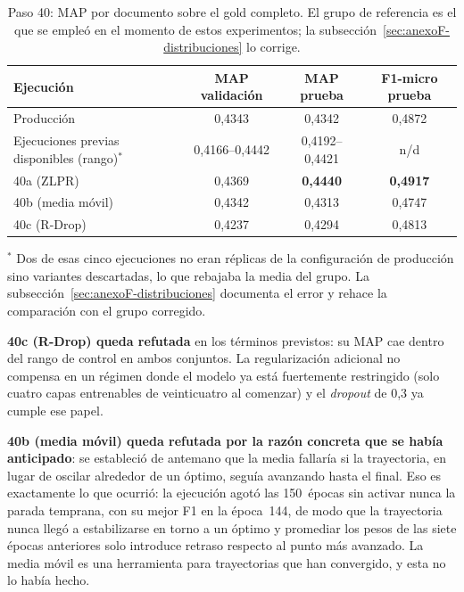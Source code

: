 \begin{table}[h]
\centering
\caption{Paso 40: MAP por documento sobre el gold completo. El grupo de referencia es el que se empleó en el momento de estos experimentos; la subsección~\ref{sec:anexoF-distribuciones} lo corrige.}
\label{tab:map-paso40}
\begin{tabular}{lccc}
\hline
\textbf{Ejecución} & \textbf{MAP validación} & \textbf{MAP prueba} & \textbf{F1-micro prueba} \\
\hline
Producción & 0{,}4343 & 0{,}4342 & 0{,}4872 \\
Ejecuciones previas disponibles (rango)$^{*}$ & 0{,}4166--0{,}4442 & 0{,}4192--0{,}4421 & n/d \\
\hline
40a (ZLPR) & 0{,}4369 & \textbf{0{,}4440} & \textbf{0{,}4917} \\
40b (media móvil) & 0{,}4342 & 0{,}4313 & 0{,}4747 \\
40c (R-Drop) & 0{,}4237 & 0{,}4294 & 0{,}4813 \\
\hline
\end{tabular}

\vspace{2mm}
{\footnotesize $^{*}$ Dos de esas cinco ejecuciones no eran réplicas de la configuración de producción sino variantes descartadas, lo que rebajaba la media del grupo. La subsección~\ref{sec:anexoF-distribuciones} documenta el error y rehace la comparación con el grupo corregido.}
\end{table}

\textbf{40c (R-Drop) queda refutada} en los términos previstos: su MAP cae dentro del rango de control en ambos conjuntos. La regularización adicional no compensa en un régimen donde el modelo ya está fuertemente restringido (solo cuatro capas entrenables de veinticuatro al comenzar) y el \emph{dropout} de 0{,}3 ya cumple ese papel.

\textbf{40b (media móvil) queda refutada por la razón concreta que se había anticipado}: se estableció de antemano que la media fallaría si la trayectoria, en lugar de oscilar alrededor de un óptimo, seguía avanzando hasta el final. Eso es exactamente lo que ocurrió: la ejecución agotó las 150~épocas sin activar nunca la parada temprana, con su mejor F1 en la época~144, de modo que la trayectoria nunca llegó a estabilizarse en torno a un óptimo y promediar los pesos de las siete épocas anteriores solo introduce retraso respecto al punto más avanzado. La media móvil es una herramienta para trayectorias que han convergido, y esta no lo había hecho.

